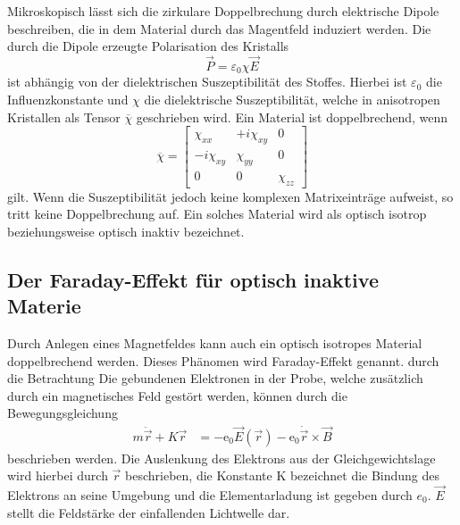 Mikroskopisch lässt sich die zirkulare Doppelbrechung durch elektrische Dipole beschreiben, die in dem Material durch das 
Magentfeld induziert werden. Die durch die Dipole erzeugte Polarisation des Kristalls 
\begin{equation*}
    \vec{P}=\varepsilon_0\chi\vec{E}
\end{equation*}
ist abhängig von der dielektrischen Suszeptibilität des Stoffes. Hierbei ist $\varepsilon_0$ die Influenzkonstante und $\chi$ die
dielektrische Suszeptibilität, welche in anisotropen Kristallen als Tensor $\overline{\chi}$ geschrieben wird.
Ein Material ist doppelbrechend, wenn
\begin{equation}
    \overline{\chi}=
    \left[
        \begin{array}{ccc}
        \chi_{xx}          & +i\chi_{xy} & 0         \\ 
        -i\chi_{xy}   & \chi_{yy}        & 0         \\
        0                  & 0                & \chi_{zz}
    \end{array}
    \right]
    \label{eqn:chi}
\end{equation}
gilt.
Wenn die Suszeptibilität jedoch keine komplexen Matrixeinträge aufweist, so tritt keine Doppelbrechung auf.
Ein solches Material wird als optisch isotrop beziehungsweise optisch inaktiv bezeichnet. 


\subsection{Der Faraday-Effekt für optisch inaktive Materie}
\label{sub:Faraday}
Durch Anlegen eines Magnetfeldes kann auch ein optisch isotropes Material doppelbrechend werden.
Dieses Phänomen wird Faraday-Effekt genannt.
durch die Betrachtung
Die gebundenen Elektronen in der Probe, welche zusätzlich durch ein magnetisches
Feld gestört werden, können durch die Bewegungsgleichung
\begin{align}
    m\ddot{\vec{r}}+K\vec{r}&=-\text{e}_0\vec{E}(\vec{r})-\text{e}_0\dot{\vec{r}}\times\vec{B}
    \label{eqn:klassische_Bewegungsgleichung}
\end{align}
beschrieben werden.
Die Auslenkung des Elektrons aus der Gleichgewichtslage wird hierbei durch $\vec{r}$ beschrieben, die
Konstante K bezeichnet die Bindung des Elektrons an seine Umgebung und die Elementarladung ist gegeben durch $e_0$.
$\vec{E}$ stellt die Feldstärke der einfallenden Lichtwelle dar.

